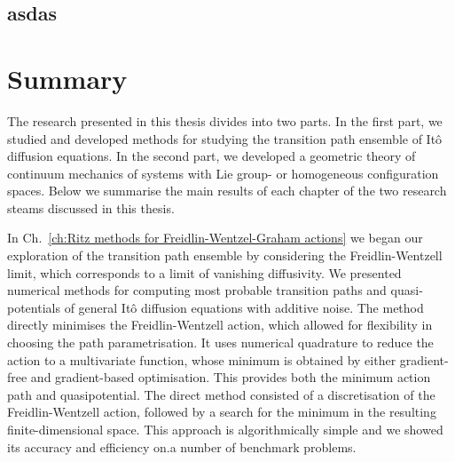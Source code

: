 \documentclass[]{cam-thesis}
\begin{document}
\section{asdas}





















\chapter*{Summary}
 
The research presented in this thesis divides into two parts. In the first part, we studied and developed methods for studying the transition path ensemble of It\^{o} diffusion equations. In the second part, we developed a geometric theory of continuum mechanics of systems with Lie group- or homogeneous configuration spaces. Below we summarise the main results of each chapter of the two research steams discussed in this thesis.


In Ch.~\ref{ch:Ritz methods for Freidlin-Wentzel-Graham actions} we began our exploration of the transition path ensemble by considering the Freidlin-Wentzell limit, which corresponds to a limit of vanishing diffusivity. We presented numerical methods for computing most probable transition paths and quasi-potentials of general It\^{o} diffusion equations with additive noise. The method directly minimises the Freidlin-Wentzell action, which allowed for flexibility in choosing the path parametrisation. It uses numerical quadrature to reduce the action to a multivariate function, whose minimum is obtained by either gradient-free and gradient-based optimisation. This provides both the minimum action path and quasipotential. The direct method consisted of a discretisation of the Freidlin-Wentzell action, followed by a search for the minimum in the resulting finite-dimensional space. This approach is algorithmically simple and we showed its accuracy and efficiency on.a number of benchmark problems.
\end{document}
